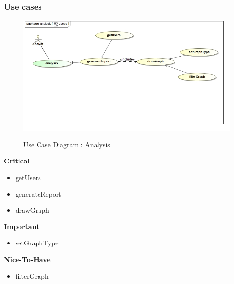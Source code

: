 \documentclass{article}
\begin{document}
		\subsubsection{Use cases}

		\begin{figure}[H]
		\includegraphics[width=\textwidth]{images/uc__analysis__scope.jpg}  \\
		\caption{Use Case Diagram : Analysis}
		\end{figure}

		\begin{flushleft}
			\textbf{Critical}
				\begin{itemize}
					\item getUsers
					\item generateReport
					\item drawGraph
				\end{itemize}
			\textbf{Important}
				\begin{itemize}
				\item setGraphType
				\end{itemize}

			\textbf{Nice-To-Have}
				\begin{itemize}
					\item filterGraph
				\end{itemize}
		\end{flushleft}
	\pagebreak
\end{document}
